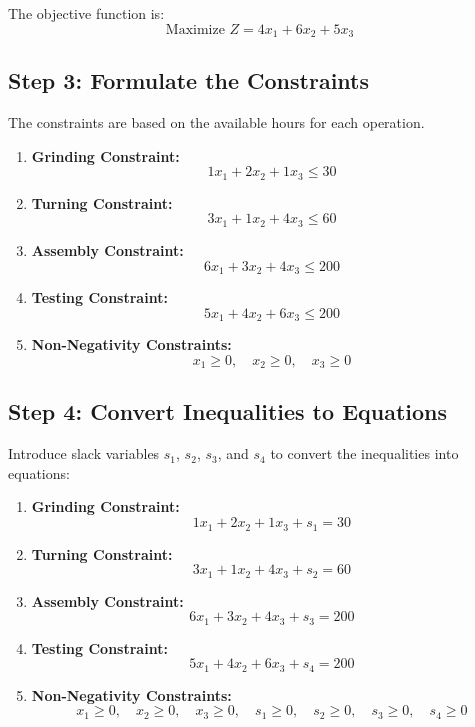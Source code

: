 \documentclass{article}
\begin{document}
The objective function is:
\[
\text{Maximize } Z = 4x_1 + 6x_2 + 5x_3
\]

\subsection*{Step 3: Formulate the Constraints}
The constraints are based on the available hours for each operation.

\begin{enumerate}
    \item \textbf{Grinding Constraint:}
    \[
    1x_1 + 2x_2 + 1x_3 \leq 30
    \]
    
    \item \textbf{Turning Constraint:}
    \[
    3x_1 + 1x_2 + 4x_3 \leq 60
    \]
    
    \item \textbf{Assembly Constraint:}
    \[
    6x_1 + 3x_2 + 4x_3 \leq 200
    \]
    
    \item \textbf{Testing Constraint:}
    \[
    5x_1 + 4x_2 + 6x_3 \leq 200
    \]
    
    \item \textbf{Non-Negativity Constraints:}
    \[
    x_1 \geq 0, \quad x_2 \geq 0, \quad x_3 \geq 0
    \]
\end{enumerate}

\subsection*{Step 4: Convert Inequalities to Equations}
Introduce slack variables \( s_1 \), \( s_2 \), \( s_3 \), and \( s_4 \) to convert the inequalities into equations:

\begin{enumerate}
    \item \textbf{Grinding Constraint:}
    \[
    1x_1 + 2x_2 + 1x_3 + s_1 = 30
    \]
    
    \item \textbf{Turning Constraint:}
    \[
    3x_1 + 1x_2 + 4x_3 + s_2 = 60
    \]
    
    \item \textbf{Assembly Constraint:}
    \[
    6x_1 + 3x_2 + 4x_3 + s_3 = 200
    \]
    
    \item \textbf{Testing Constraint:}
    \[
    5x_1 + 4x_2 + 6x_3 + s_4 = 200
    \]
    
    \item \textbf{Non-Negativity Constraints:}
    \[
    x_1 \geq 0, \quad x_2 \geq 0, \quad x_3 \geq 0, \quad s_1 \geq 0, \quad s_2 \geq 0, \quad s_3 \geq 0, \quad s_4 \geq 0
    \]
\end{enumerate}
\end{document}
